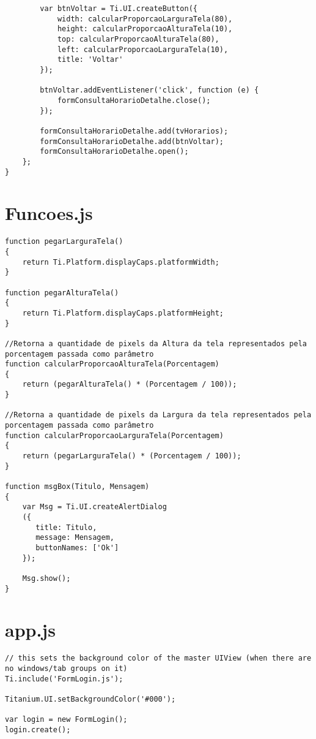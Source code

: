 \begin{lstlisting}
        var btnVoltar = Ti.UI.createButton({
            width: calcularProporcaoLarguraTela(80),
            height: calcularProporcaoAlturaTela(10),
            top: calcularProporcaoAlturaTela(80),
            left: calcularProporcaoLarguraTela(10),
            title: 'Voltar'
        });

        btnVoltar.addEventListener('click', function (e) {
            formConsultaHorarioDetalhe.close();
        });

        formConsultaHorarioDetalhe.add(tvHorarios);
        formConsultaHorarioDetalhe.add(btnVoltar);
        formConsultaHorarioDetalhe.open();
    };
}
\end{lstlisting}

\section{Funcoes.js}
\begin{lstlisting}
function pegarLarguraTela()
{
	return Ti.Platform.displayCaps.platformWidth;
}

function pegarAlturaTela()
{
	return Ti.Platform.displayCaps.platformHeight;
}

//Retorna a quantidade de pixels da Altura da tela representados pela porcentagem passada como parâmetro
function calcularProporcaoAlturaTela(Porcentagem)
{
	return (pegarAlturaTela() * (Porcentagem / 100));
}

//Retorna a quantidade de pixels da Largura da tela representados pela porcentagem passada como parâmetro
function calcularProporcaoLarguraTela(Porcentagem)
{
	return (pegarLarguraTela() * (Porcentagem / 100));
}

function msgBox(Titulo, Mensagem)
{
	var Msg = Ti.UI.createAlertDialog
	({
	   title: Titulo,
	   message: Mensagem,
	   buttonNames: ['Ok']	
	});
	
	Msg.show();
}
\end{lstlisting}

\section{app.js}
\begin{lstlisting}
// this sets the background color of the master UIView (when there are no windows/tab groups on it)
Ti.include('FormLogin.js');

Titanium.UI.setBackgroundColor('#000');

var login = new FormLogin();
login.create();
\end{lstlisting}
